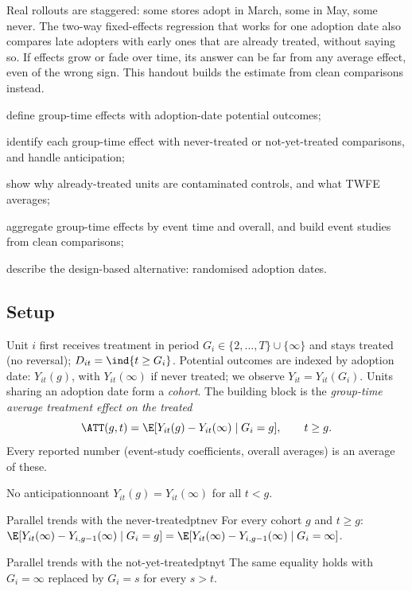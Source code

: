 \documentclass[11pt]{article}
\begin{document}

\begin{decision}
Real rollouts are staggered: some stores adopt in March, some in May, some never. The two-way fixed-effects regression that
works for one adoption date also compares late adopters with early ones that are already treated, without saying so. If effects grow or fade
over time, its answer can be far from any average effect, even of the wrong sign. This handout builds the estimate from clean
comparisons instead.
\end{decision}

\begin{goals}
  \item define group-time effects with adoption-date potential outcomes;
  \item identify each group-time effect with never-treated or not-yet-treated comparisons, and handle anticipation;
  \item show why already-treated units are contaminated controls, and what TWFE averages;
  \item aggregate group-time effects by event time and overall, and build event studies from clean comparisons;
  \item describe the design-based alternative: randomised adoption dates.
\end{goals}

\sectionone

\subsection{Setup}

Unit $i$ first receives treatment in period $G_i \in \{2, \dots, T\} \cup \{\infty\}$ and stays treated (no reversal); $D_{it} = \ind{t \ge G_i}$. Potential
outcomes are indexed by adoption date: $Y_{it}(g)$, with $Y_{it}(\infty)$ if never treated; we observe $Y_{it} = Y_{it}(G_i)$. Units sharing an adoption
date form a \emph{cohort}. The building block is the \emph{group-time average treatment effect on the treated}
\[
  \ATT(g, t) = \E[Y_{it}(g) - Y_{it}(\infty) \mid G_i = g], \qquad t \ge g .
\]
Every reported number (event-study coefficients, overall averages) is an average of these.

\begin{assum}{No anticipation}{noant}
$Y_{it}(g) = Y_{it}(\infty)$ for all $t < g$.
\end{assum}
\begin{assum}{Parallel trends with the never-treated}{ptnev}
For every cohort $g$ and $t \ge g$: $\E[Y_{it}(\infty) - Y_{i,g-1}(\infty) \mid G_i = g] = \E[Y_{it}(\infty) - Y_{i,g-1}(\infty) \mid G_i = \infty]$.
\end{assum}
\begin{assum}{Parallel trends with the not-yet-treated}{ptnyt}
The same equality holds with $G_i = \infty$ replaced by $G_i = s$ for every $s > t$.
\end{assum}
\end{document}
